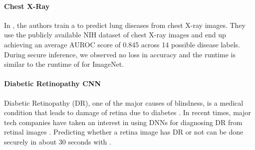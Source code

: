 \paragraph{Chest X-Ray} In \cite{chestxray2018}, the authors train a {\densenet} to predict lung diseases from chest X-ray images. They use the publicly available NIH dataset of chest X-ray images and end up achieving an average AUROC score of 0.845 across 14 possible disease labels.
During secure inference, we observed no loss in accuracy and the runtime is similar to the runtime of \densenet for ImageNet.

\paragraph{Diabetic Retinopathy CNN} Diabetic Retinopathy (DR), one of the major causes of blindness, is a medical condition that leads to damage of retina due to diabetes \cite{janakirammsv2017}. In recent times, major tech companies have taken an interest in using DNNs for diagnosing DR from retinal images \cite{janakirammsv2017,googleDRPaper}. 
Predicting whether a retina image has DR or not can be done securely in about 30 seconds with \tool.
